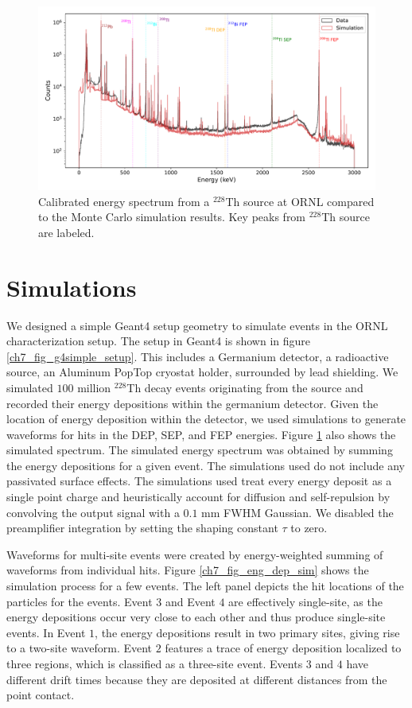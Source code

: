 \begin{figure}%
\centering
    \includegraphics[width=0.99\linewidth,trim={0.5cm 0pc 0.5cm 0pc},clip]{ch7/figs/energy_spectrum_comparison.pdf}
    \caption{Calibrated energy spectrum from a $^{228}$Th source at ORNL compared to the Monte Carlo simulation results. Key peaks from $^{228}$Th source are labeled.}
   \label{ch7_fig_eng_spec_comp}
\end{figure}

\section{Simulations}
We designed a simple Geant4 setup geometry to simulate events in the ORNL characterization setup. The setup in Geant4 is shown in figure \ref{ch7_fig_g4simple_setup}. This includes a Germanium detector, a radioactive source, an Aluminum PopTop cryostat holder, surrounded by lead shielding. We simulated $100$ million $^{228}$Th decay events originating from the source and recorded their energy depositions within the germanium detector. Given the location of energy deposition within the detector, we used {\siggen} simulations to generate waveforms for hits in the DEP, SEP, and FEP energies. Figure \ref{ch7_fig_eng_spec_comp} also shows the simulated spectrum. The simulated energy spectrum was obtained by summing the energy depositions for a given event. The {\siggen} simulations used do not include any passivated surface effects. The {\siggen} simulations used treat every energy deposit as a single point charge and heuristically account for diffusion and self-repulsion by convolving the output signal with a $0.1$ mm FWHM Gaussian. We disabled the preamplifier integration by setting the shaping constant $\tau$ to zero.

Waveforms for multi-site events were created by energy-weighted summing of waveforms from individual hits. Figure \ref{ch7_fig_eng_dep_sim} shows the simulation process for a few events. The left panel depicts the hit locations of the particles for the events. Event $3$ and Event $4$ are effectively single-site, as the energy depositions occur very close to each other and thus produce single-site events. In Event $1$, the energy depositions result in two primary sites, giving rise to a two-site waveform. Event $2$ features a trace of energy deposition localized to three regions, which is classified as a three-site event. Events $3$ and $4$ have different drift times because they are deposited at different distances from the point contact.

